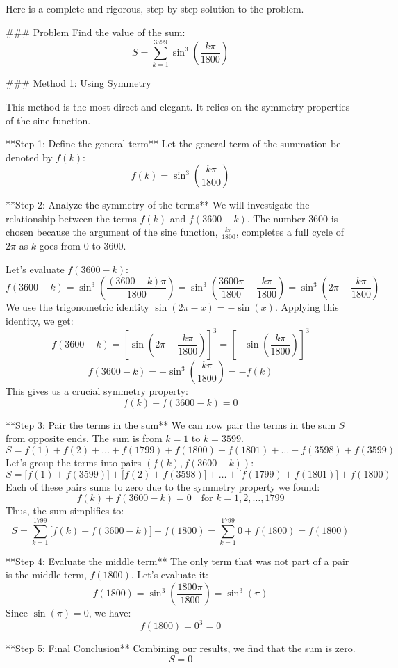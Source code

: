 Here is a complete and rigorous, step-by-step solution to the problem.

### Problem
Find the value of the sum:
$$S = \sum_{k=1}^{3599} \sin^3\left(\frac{k\pi}{1800}\right)$$

### Method 1: Using Symmetry

This method is the most direct and elegant. It relies on the symmetry properties of the sine function.

**Step 1: Define the general term**
Let the general term of the summation be denoted by $f(k)$:
$$f(k) = \sin^3\left(\frac{k\pi}{1800}\right)$$

**Step 2: Analyze the symmetry of the terms**
We will investigate the relationship between the terms $f(k)$ and $f(3600-k)$. The number $3600$ is chosen because the argument of the sine function, $\frac{k\pi}{1800}$, completes a full cycle of $2\pi$ as $k$ goes from $0$ to $3600$.

Let's evaluate $f(3600-k)$:
$$f(3600-k) = \sin^3\left(\frac{(3600-k)\pi}{1800}\right) = \sin^3\left(\frac{3600\pi}{1800} - \frac{k\pi}{1800}\right) = \sin^3\left(2\pi - \frac{k\pi}{1800}\right)$$
We use the trigonometric identity $\sin(2\pi - x) = -\sin(x)$. Applying this identity, we get:
$$f(3600-k) = \left[\sin\left(2\pi - \frac{k\pi}{1800}\right)\right]^3 = \left[-\sin\left(\frac{k\pi}{1800}\right)\right]^3$$
$$f(3600-k) = -\sin^3\left(\frac{k\pi}{1800}\right) = -f(k)$$
This gives us a crucial symmetry property:
$$f(k) + f(3600-k) = 0$$

**Step 3: Pair the terms in the sum**
We can now pair the terms in the sum $S$ from opposite ends. The sum is from $k=1$ to $k=3599$.
$$S = f(1) + f(2) + \dots + f(1799) + f(1800) + f(1801) + \dots + f(3598) + f(3599)$$
Let's group the terms into pairs $(f(k), f(3600-k))$:
$$S = \big[f(1) + f(3599)\big] + \big[f(2) + f(3598)\big] + \dots + \big[f(1799) + f(1801)\big] + f(1800)$$
Each of these pairs sums to zero due to the symmetry property we found:
$$f(k) + f(3600-k) = 0 \quad \text{for } k=1, 2, \dots, 1799$$
Thus, the sum simplifies to:
$$S = \sum_{k=1}^{1799} \big[f(k) + f(3600-k)\big] + f(1800) = \sum_{k=1}^{1799} 0 + f(1800) = f(1800)$$

**Step 4: Evaluate the middle term**
The only term that was not part of a pair is the middle term, $f(1800)$. Let's evaluate it:
$$f(1800) = \sin^3\left(\frac{1800\pi}{1800}\right) = \sin^3(\pi)$$
Since $\sin(\pi) = 0$, we have:
$$f(1800) = 0^3 = 0$$

**Step 5: Final Conclusion**
Combining our results, we find that the sum is zero.
$$S = 0$$

